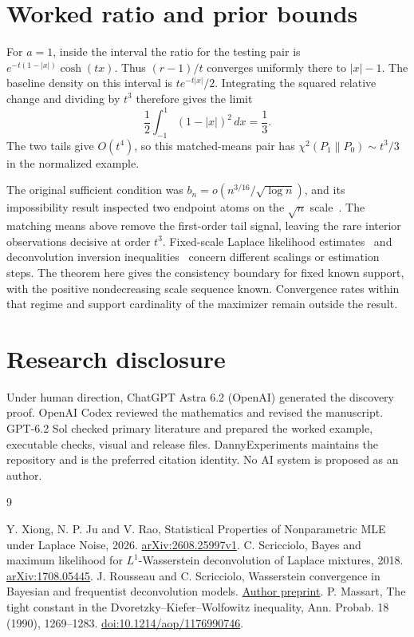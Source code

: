 \documentclass[11pt]{amsart}
\begin{document}
\section{Worked ratio and prior bounds}
For \(a=1\), inside the interval the ratio for the testing pair is \(e^{-t(1-|x|)}\cosh(tx)\). Thus \((r-1)/t\) converges uniformly there to \(|x|-1\). The baseline density on this interval is \(t e^{-t|x|}/2\). Integrating the squared relative change and dividing by \(t^3\) therefore gives the limit
\[
           \frac12\int_{-1}^1(1-|x|)^2\,dx=\frac13.
\]
The two tails give \(O(t^4)\), so this matched-means pair has \(\chi^2(P_1\|P_0)\sim t^3/3\) in the normalized example.

The original sufficient condition was \(b_n=o(n^{3/16}/\sqrt{\log n})\), and its impossibility result inspected two endpoint atoms on the \(\sqrt n\) scale~\cite[Corollary~5.3 and Theorem~5.4]{XJR}. The matching means above remove the first-order tail signal, leaving the rare interior observations decisive at order \(t^3\). Fixed-scale Laplace likelihood estimates~\cite{S} and deconvolution inversion inequalities~\cite{RS} concern different scalings or estimation steps. The theorem here gives the consistency boundary for fixed known support, with the positive nondecreasing scale sequence known. Convergence rates within that regime and support cardinality of the maximizer remain outside the result.

\section*{Research disclosure}
Under human direction, ChatGPT Astra 6.2 (OpenAI) generated the discovery proof. OpenAI Codex reviewed the mathematics and revised the manuscript. GPT-6.2 Sol checked primary literature and prepared the worked example, executable checks, visual and release files. DannyExperiments maintains the repository and is the preferred citation identity. No AI system is proposed as an author.

\begin{thebibliography}{9}
\raggedright
{} Y. Xiong, N. P. Ju and V. Rao, Statistical Properties of Nonparametric MLE under Laplace Noise, 2026. \href{https://arxiv.org/abs/2608.25997v1}{arXiv:2608.25997v1}.
 C. Scricciolo, Bayes and maximum likelihood for \(L^1\)-Wasserstein deconvolution of Laplace mixtures, 2018. \href{https://arxiv.org/abs/1708.05445}{arXiv:1708.05445}.
 J. Rousseau and C. Scricciolo, Wasserstein convergence in Bayesian and frequentist deconvolution models. \href{https://arxiv.org/abs/2309.15300}{Author preprint}.
 P. Massart, The tight constant in the Dvoretzky--Kiefer--Wolfowitz inequality, Ann. Probab. 18 (1990), 1269--1283. \href{https://doi.org/10.1214/aop/1176990746}{doi:10.1214/aop/1176990746}.
\end{thebibliography}
\end{document}
